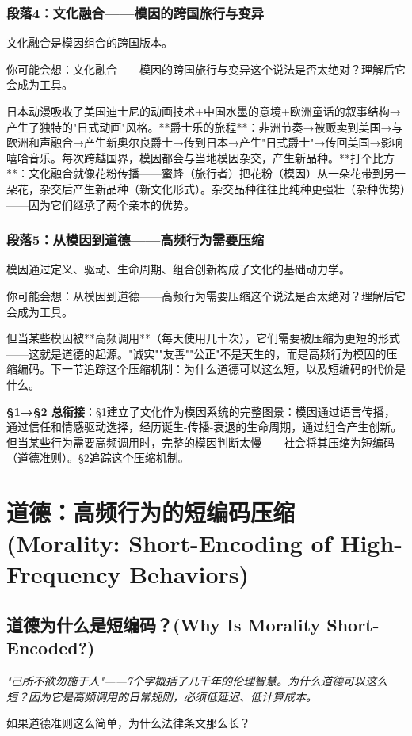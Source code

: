 \documentclass[a4paper,12pt]{book}
\newenvironment{motivation}{\begin{tcolorbox}[colback=gray!10,colframe=gray!60,title=\textit{本章动机 (Motivation)},fonttitle=\bfseries,arc=0mm,leftrule=3mm]\small\itshape}{\end{tcolorbox}}
\newenvironment{questionbox}{\begin{tcolorbox}[colback=red!3!white,colframe=red!60!black]}{\end{tcolorbox}}
\begin{document}
\begin{motivation}
\begin{motivation}
\begin{motivation}
	\subsubsection*{段落4：文化融合——模因的跨国旅行与变异}
文化融合是模因组合的跨国版本。
	\begin{tcolorbox}[colback=yellow!5, title=\textit{读者行为预测}]
		你可能会想：文化融合——模因的跨国旅行与变异这个说法是否太绝对？理解后它会成为工具。
	\end{tcolorbox}

日本动漫吸收了美国迪士尼的动画技术+中国水墨的意境+欧洲童话的叙事结构→产生了独特的"日式动画"风格。**爵士乐的旅程**：非洲节奏→被贩卖到美国→与欧洲和声融合→产生新奥尔良爵士→传到日本→产生"日式爵士"→传回美国→影响嘻哈音乐。每次跨越国界，模因都会与当地模因杂交，产生新品种。**打个比方**：文化融合就像花粉传播——蜜蜂（旅行者）把花粉（模因）从一朵花带到另一朵花，杂交后产生新品种（新文化形式）。杂交品种往往比纯种更强壮（杂种优势）——因为它们继承了两个亲本的优势。

	\subsubsection*{段落5：从模因到道德——高频行为需要压缩}
模因通过定义、驱动、生命周期、组合创新构成了文化的基础动力学。
	\begin{tcolorbox}[colback=yellow!5, title=\textit{读者行为预测}]
		你可能会想：从模因到道德——高频行为需要压缩这个说法是否太绝对？理解后它会成为工具。
	\end{tcolorbox}

但当某些模因被**高频调用**（每天使用几十次），它们需要被压缩为更短的形式——这就是道德的起源。"诚实""友善""公正"不是天生的，而是高频行为模因的压缩编码。下一节追踪这个压缩机制：为什么道德可以这么短，以及短编码的代价是什么。

	\textbf{§1→§2 总衔接}：§1建立了文化作为模因系统的完整图景：模因通过语言传播，通过信任和情感驱动选择，经历诞生-传播-衰退的生命周期，通过组合产生创新。但当某些行为需要高频调用时，完整的模因判断太慢——社会将其压缩为短编码（道德准则）。§2追踪这个压缩机制。

	
	\section{道德：高频行为的短编码压缩 (Morality: Short-Encoding of High-Frequency Behaviors)}

	\subsection{道德为什么是短编码？(Why Is Morality Short-Encoded?)}
	\begin{motivation}
		"己所不欲勿施于人"——7个字概括了几千年的伦理智慧。为什么道德可以这么短？因为它是高频调用的日常规则，必须低延迟、低计算成本。
	\end{motivation}
	\begin{questionbox}
		如果道德准则这么简单，为什么法律条文那么长？
	\end{questionbox}


\end{motivation}
\end{motivation}
\end{motivation}
\end{document}
